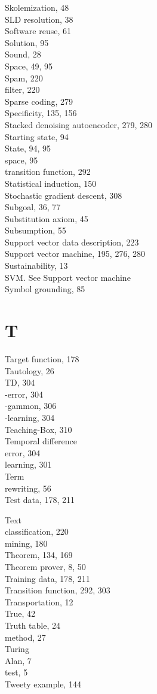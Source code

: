 \documentclass[10pt]{article}
\begin{document}
Skolemization, 48\\
SLD resolution, 38\\
Software reuse, 61\\
Solution, 95\\
Sound, 28\\
Space, 49, 95\\
Spam, 220\\
filter, 220\\
Sparse coding, 279\\
Specificity, 135, 156\\
Stacked denoising autoencoder, 279, 280\\
Starting state, 94\\
State, 94, 95\\
space, 95\\
transition function, 292\\
Statistical induction, 150\\
Stochastic gradient descent, 308\\
Subgoal, 36, 77\\
Substitution axiom, 45\\
Subsumption, 55\\
Support vector data description, 223\\
Support vector machine, 195, 276, 280\\
Sustainability, 13\\
SVM. See Support vector machine\\
Symbol grounding, 85

\section*{T}
Target function, 178\\
Tautology, 26\\
TD, 304\\
-error, 304\\
-gammon, 306\\
-learning, 304\\
Teaching-Box, 310\\
Temporal difference\\
error, 304\\
learning, 301\\
Term\\
rewriting, 56\\
Test data, 178, 211

Text\\
classification, 220\\
mining, 180\\
Theorem, 134, 169\\
Theorem prover, 8, 50\\
Training data, 178, 211\\
Transition function, 292, 303\\
Transportation, 12\\
True, 42\\
Truth table, 24\\
method, 27\\
Turing\\
Alan, 7\\
test, 5\\
Tweety example, 144
\end{document}
